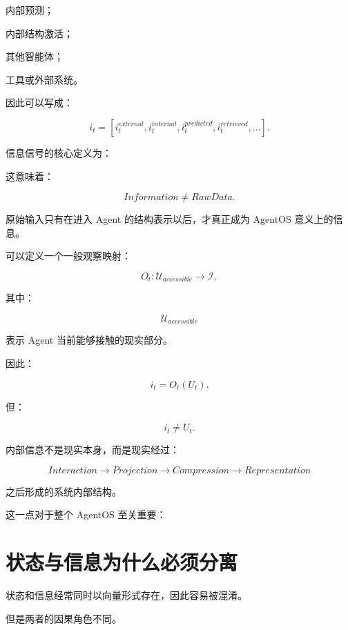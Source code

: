 内部预测；

内部结构激活；

其他智能体；

工具或外部系统。

因此可以写成：

\[
i_t
=
[
i_t^{external},
i_t^{internal},
i_t^{predicted},
i_t^{retrieved},
\ldots
].
\]

信息信号的核心定义为：

\begin{statementbox}
\centering
{}
\end{statementbox}

这意味着：

\[
Information
\neq
RawData.
\]

原始输入只有在进入 Agent 的结构表示以后，才真正成为 AgentOS 意义上的信息。

可以定义一个一般观察映射：

\[
O_t:
\mathcal U_{accessible}
\rightarrow
\mathcal I,
\]

其中：

\[
\mathcal U_{accessible}
\]

表示 Agent 当前能够接触的现实部分。

因此：

\[
i_t
=
O_t(U_t).
\]

但：

\[
\boxed{
i_t\neq U_t.
}
\]

内部信息不是现实本身，而是现实经过：

\[
Interaction
\rightarrow
Projection
\rightarrow
Compression
\rightarrow
Representation
\]

之后形成的系统内部结构。

这一点对于整个 AgentOS 至关重要：

\begin{statementbox}
\centering
{}
\end{statementbox}

\section{状态与信息为什么必须分离}

状态和信息经常同时以向量形式存在，因此容易被混淆。

但是两者的因果角色不同。

